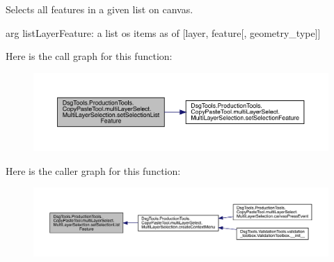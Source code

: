 \begin{DoxyVerb}Selects all features in a given list on canvas.

arg listLayerFeature: a list os items as of [layer, feature[, geometry_type]]
\end{DoxyVerb}
 Here is the call graph for this function\+:
\nopagebreak
\begin{figure}[H]
\begin{center}
\leavevmode
\includegraphics[width=350pt]{class_dsg_tools_1_1_production_tools_1_1_copy_paste_tool_1_1multi_layer_select_1_1_multi_layer_selection_a98ef566da0b3d8a1ac39d63bde80dd3b_cgraph}
\end{center}
\end{figure}
Here is the caller graph for this function\+:
\nopagebreak
\begin{figure}[H]
\begin{center}
\leavevmode
\includegraphics[width=350pt]{class_dsg_tools_1_1_production_tools_1_1_copy_paste_tool_1_1multi_layer_select_1_1_multi_layer_selection_a98ef566da0b3d8a1ac39d63bde80dd3b_icgraph}
\end{center}
\end{figure}
\mbox{\label{class_dsg_tools_1_1_production_tools_1_1_copy_paste_tool_1_1multi_layer_select_1_1_multi_layer_selection_a0aacbbcbe3d1d815cccc49cd1abe27af}} 
